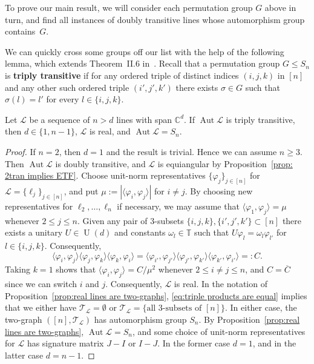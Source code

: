 To prove our main result, we will consider each permutation group $G$ above in turn, and find all instances of doubly transitive lines whose automorphism group contains~$G$.

We can quickly cross some groups off our list with the help of the following lemma, which extends Theorem~II.6 in~\cite{King:19}.
Recall that a permutation group $G \leq S_n$ is \textbf{triply transitive} if for any ordered triple of distinct indices $(i,j,k)$ in $[n]$ and any other such ordered triple $(i',j',k')$ there exists $\sigma \in G$ such that $\sigma(l) = l'$ for every $l \in \{ i,j,k\}$.

\begin{lemma}
\label{lem.3tran}
Let $\mathscr{L}$ be a sequence of $n>d$ lines with span $\mathbb{C}^d$.
If $\operatorname{Aut} \mathscr{L}$ is triply transitive, then $d\in\{1,n-1\}$, $\mathscr{L}$ is real, and $\operatorname{Aut} \mathscr{L} =S_n$.
\end{lemma}

\begin{proof}
If $n=2$, then $d=1$ and the result is trivial.
Hence we can assume $n \geq 3$.
Then $\operatorname{Aut} \mathscr{L}$ is doubly transitive, and $\mathscr{L}$ is equiangular by Proposition~\ref{prop: 2tran implies ETF}.
Choose unit-norm representatives $\{ \varphi_j \}_{j\in [n]}$ for $\mathscr{L} = \{ \ell_j \}_{j\in [n]}$, and put $\mu := | \langle \varphi_i, \varphi_j \rangle|$ for $i \neq j$.
By choosing new representatives for $\ell_2,\dotsc,\ell_n$ if necessary, we may assume that $\langle \varphi_1,\varphi_j \rangle = \mu$ whenever $2 \leq j \leq n$.
Given any pair of 3-subsets $\{i,j,k\}, \{i',j',k'\} \subset [n]$ there exists a unitary $U \in \operatorname{U}(d)$ and constants $\omega_l \in \mathbb{T}$ such that $U \varphi_l = \omega_l \varphi_{l'}$ for $l \in \{ i,j,k\}$.
Consequently,
\begin{equation}
\label{eq:triple products are equal}
\langle \varphi_i, \varphi_j \rangle \langle \varphi_j, \varphi_k \rangle \langle \varphi_k, \varphi_i \rangle = \langle \varphi_{i'}, \varphi_{j'} \rangle \langle \varphi_{j'}, \varphi_{k'} \rangle \langle \varphi_{k'}, \varphi_{i'} \rangle =: C.
\end{equation}
Taking $k=1$ shows that $\langle \varphi_i, \varphi_j \rangle = C/\mu^2$ whenever $2 \leq i\neq j \leq n$, and $C = \overline{C}$ since we can switch $i$ and $j$.
Consequently, $\mathscr{L}$ is real.
In the notation of Proposition~\ref{prop:real lines are two-graphs}, \eqref{eq:triple products are equal} implies that we either have $\mathcal{T}_{\mathscr{L}} = \emptyset$ or $\mathcal{T}_{\mathscr{L}} = \{ \text{all 3-subsets of }[n]\}$.
In either case, the two-graph $([n],\mathcal{T}_{\mathscr{L}})$ has automorphism group $S_n$.
By Proposition~\ref{prop:real lines are two-graphs}, $\operatorname{Aut}\mathscr{L} = S_n$, and some choice of unit-norm representatives for $\mathscr{L}$ has signature matrix $J-I$ or $I-J$.
In the former case $d=1$, and in the latter case $d=n-1$.
\end{proof}

